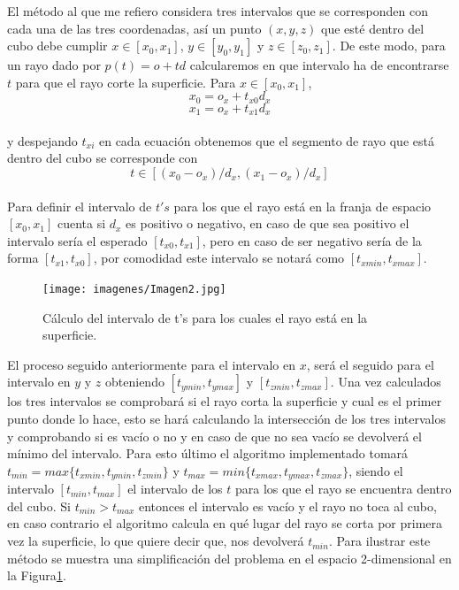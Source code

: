 El método al que me refiero considera tres intervalos que se corresponden con cada una de las tres coordenadas, así un punto $(x, y, z)$ que esté dentro del cubo debe cumplir $x \in [x_0, x_1]$, $y \in [y_0, y_1]$ y $z \in [z_0, z_1]$. De este modo, para un rayo dado por $p(t) = o + td$ calcularemos en que intervalo ha de encontrarse $t$ para que el rayo corte la superficie. Para $x \in [x_0, x_1]$,
${ }$\\
\[
	x_0 = o_x + t_{x0}d_x
\]
\[
	x_1 = o_x + t_{x1}d_x
\]
${ }$\\
y despejando $t_{xi}$ en cada ecuación obtenemos que el segmento de rayo que está dentro del cubo se corresponde con
${ }$\\
\[
	t \in [(x_0-o_x)/d_x, (x_1-o_x)/d_x]
\]
${ }$\\

Para definir el intervalo de $t's$ para los que el rayo está en la franja de espacio $[x_0, x_1]$ cuenta si $d_x$ es positivo o negativo, en caso de que sea positivo el intervalo sería el esperado $[t_{x0}, t_{x1}]$, pero en caso de ser negativo sería de la forma $[t_{x1}, t_{x0}]$, por comodidad este intervalo se notará como $[t_{x min}, t_{x max}]$.
	${ }$\\	
\begin{figure}[h]
	\begin{center}
		\texttt{[image: imagenes/Imagen2.jpg]}
	\end{center}
	\caption{Cálculo del intervalo de t's para los cuales el rayo está en la superficie.}
	\label{fig:etiq_4}
\end{figure}




El proceso seguido anteriormente para el intervalo en $x$, será el seguido para el intervalo en $y$ y $z$ obteniendo $[t_{y min}, t_{y max}]$ y $[t_{z min}, t_{z max}]$. Una vez calculados los tres intervalos se comprobará si el rayo corta la superficie y cual es el primer punto donde lo hace, esto se hará calculando la intersección de los tres intervalos y comprobando si es vacío o no y en caso de que no sea vacío se devolverá el mínimo del intervalo. Para esto último el algoritmo implementado tomará $t_{min} = max\{t_{x min}, t_{y min}, t_{z min}\}$ y $t_{max} = min\{t_{x max}, t_{y max}, t_{z max}\}$, siendo el intervalo $[t_{min}, t_{max}]$ el intervalo de los $t$ para los que el rayo se encuentra dentro del cubo. Si $t_{min} > t_{max}$ entonces el intervalo es vacío y el rayo no toca al cubo, en caso contrario el algoritmo calcula en qué lugar del rayo se corta por primera vez la superficie, lo que quiere decir que, nos devolverá $t_{min}$. Para ilustrar este método se muestra una simplificación del problema en el espacio 2-dimensional en la Figura\ref{fig:etiq_4}.
${ }$\\	



